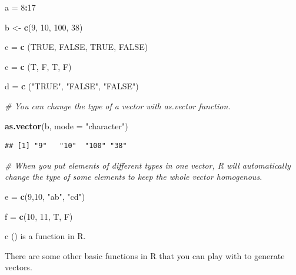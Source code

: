 \documentclass[]{book}
\newenvironment{Shaded}{\begin{snugshade}}{\end{snugshade}}
\newcommand{\KeywordTok}[1]{\textcolor[rgb]{0.13,0.29,0.53}{\textbf{#1}}}
\newcommand{\DataTypeTok}[1]{\textcolor[rgb]{0.13,0.29,0.53}{#1}}
\newcommand{\DecValTok}[1]{\textcolor[rgb]{0.00,0.00,0.81}{#1}}
\newcommand{\StringTok}[1]{\textcolor[rgb]{0.31,0.60,0.02}{#1}}
\newcommand{\CommentTok}[1]{\textcolor[rgb]{0.56,0.35,0.01}{\textit{#1}}}
\newcommand{\OtherTok}[1]{\textcolor[rgb]{0.56,0.35,0.01}{#1}}
\newcommand{\OperatorTok}[1]{\textcolor[rgb]{0.81,0.36,0.00}{\textbf{#1}}}
\newcommand{\NormalTok}[1]{#1}
\begin{document}
\begin{Shaded}
\begin{Highlighting}[]
\NormalTok{a =}\StringTok{ }\DecValTok{8}\OperatorTok{:}\DecValTok{17}

\NormalTok{b <-}\StringTok{ }\KeywordTok{c}\NormalTok{(}\DecValTok{9}\NormalTok{, }\DecValTok{10}\NormalTok{, }\DecValTok{100}\NormalTok{, }\DecValTok{38}\NormalTok{)}

\NormalTok{c =}\StringTok{ }\KeywordTok{c}\NormalTok{ (}\OtherTok{TRUE}\NormalTok{, }\OtherTok{FALSE}\NormalTok{, }\OtherTok{TRUE}\NormalTok{, }\OtherTok{FALSE}\NormalTok{)}

\NormalTok{c =}\StringTok{ }\KeywordTok{c}\NormalTok{ (T, F, T, F)}

\NormalTok{d =}\StringTok{ }\KeywordTok{c}\NormalTok{ (}\StringTok{"TRUE"}\NormalTok{, }\StringTok{"FALSE"}\NormalTok{, }\StringTok{"FALSE"}\NormalTok{)}

\CommentTok{# You can change the type of a vector with as.vector function.}

\KeywordTok{as.vector}\NormalTok{(b, }\DataTypeTok{mode =} \StringTok{"character"}\NormalTok{)}
\end{Highlighting}
\end{Shaded}

\begin{verbatim}
## [1] "9"   "10"  "100" "38"
\end{verbatim}

\begin{Shaded}
\begin{Highlighting}[]
\CommentTok{# When you put elements of different types in one vector, R will automatically change the type of some elements to keep the whole vector homogenous.}

\NormalTok{e =}\StringTok{ }\KeywordTok{c}\NormalTok{(}\DecValTok{9}\NormalTok{,}\DecValTok{10}\NormalTok{, }\StringTok{"ab"}\NormalTok{, }\StringTok{"cd"}\NormalTok{)}

\NormalTok{f =}\StringTok{ }\KeywordTok{c}\NormalTok{(}\DecValTok{10}\NormalTok{, }\DecValTok{11}\NormalTok{, T, F)}
\end{Highlighting}
\end{Shaded}

c () is a function in R.

There are some other basic functions in R that you can play with to
generate vectors.
\end{document}
